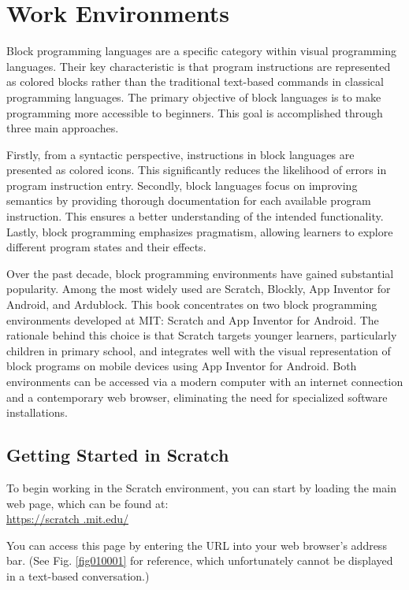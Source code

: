 \chapter{Work Environments}

Block programming languages are a specific category within visual programming languages. Their key characteristic is that program instructions are represented as colored blocks rather than the traditional text-based commands in classical programming languages. The primary objective of block languages is to make programming more accessible to beginners. This goal is accomplished through three main approaches.

Firstly, from a syntactic perspective, instructions in block languages are presented as colored icons. This significantly reduces the likelihood of errors in program instruction entry. Secondly, block languages focus on improving semantics by providing thorough documentation for each available program instruction. This ensures a better understanding of the intended functionality. Lastly, block programming emphasizes pragmatism, allowing learners to explore different program states and their effects.

Over the past decade, block programming environments have gained substantial popularity. Among the most widely used are Scratch, Blockly, App Inventor for Android, and Ardublock. This book concentrates on two block programming environments developed at MIT: Scratch and App Inventor for Android. The rationale behind this choice is that Scratch targets younger learners, particularly children in primary school, and integrates well with the visual representation of block programs on mobile devices using App Inventor for Android. Both environments can be accessed via a modern computer with an internet connection and a contemporary web browser, eliminating the need for specialized software installations.

\section{Getting Started in Scratch}

To begin working in the Scratch environment, you can start by loading the main web page, which can be found at: \\ \href{https://scratch.mit.edu/}{https://scratch .mit.edu/}

You can access this page by entering the URL into your web browser's address bar. (See Fig. \ref{fig010001} for reference, which unfortunately cannot be displayed in a text-based conversation.)

